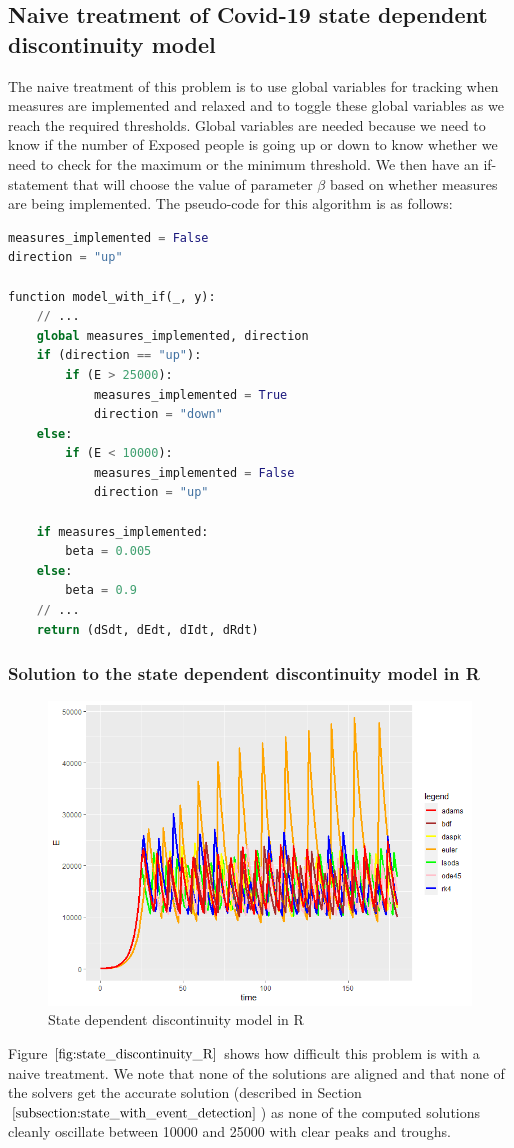 \subsection{Naive treatment of Covid-19 state dependent discontinuity model}
\label{subsection:naive_state_problem}
The naive treatment of this problem is to use global variables for tracking when measures are implemented and relaxed and to toggle these global variables as we reach the required thresholds. Global variables are needed because we need to know if the number of Exposed people is going up or down to know whether we need to check for the maximum or the minimum threshold. We then have an if-statement that will choose the value of parameter $\beta$ based on whether measures are being implemented. The pseudo-code for this algorithm is as follows:

\begin{minipage}{\linewidth}
\begin{lstlisting}[language=Python]
measures_implemented = False
direction = "up"

function model_with_if(_, y):
    // ...
    global measures_implemented, direction
    if (direction == "up"):
        if (E > 25000):
            measures_implemented = True
            direction = "down"
    else:
        if (E < 10000):
            measures_implemented = False
            direction = "up"

    if measures_implemented:
        beta = 0.005 
    else:
        beta = 0.9
    // ...
    return (dSdt, dEdt, dIdt, dRdt)
\end{lstlisting}
\end{minipage}

\subsubsection{Solution to the state dependent discontinuity model in R}
\begin{figure}[H]
\centering
\includegraphics[width=0.7\linewidth]{./figures/state_discontinuity_R}
\caption{State dependent discontinuity model in R}
\label{fig:state_discontinuity_R}
\end{figure}
Figure $\ref{fig:state_discontinuity_R}$ shows how difficult this problem is with a naive treatment. We note that none of the solutions are aligned and that none of the solvers get the accurate solution (described in Section $\ref{subsection:state_with_event_detection}$) as none of the computed solutions cleanly oscillate between 10000 and 25000 with clear peaks and troughs.

